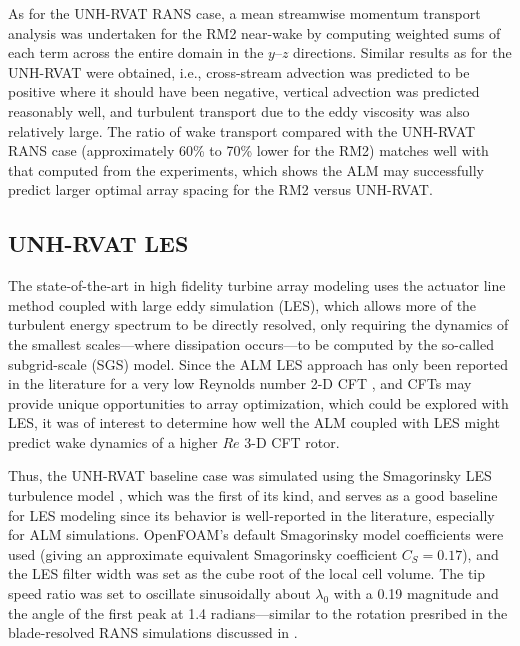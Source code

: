 \documentclass[times]{weauth}
\begin{document}
As for the UNH-RVAT RANS case, a mean streamwise momentum transport analysis was
undertaken for the RM2 near-wake by computing weighted sums of each term across
the entire domain in the $y$--$z$ directions. Similar results as for the
UNH-RVAT were obtained, i.e., cross-stream advection was predicted to be
positive where it should have been negative, vertical advection was predicted
reasonably well, and turbulent transport due to the eddy viscosity was also
relatively large. The ratio of wake transport compared with the UNH-RVAT RANS
case (approximately 60\% to 70\% lower for the RM2) matches well with that
computed from the experiments, which shows the ALM may successfully predict
larger optimal array spacing for the RM2 versus UNH-RVAT.


\subsection{UNH-RVAT LES}

The state-of-the-art in high fidelity turbine array modeling uses the actuator
line method coupled with large eddy simulation (LES), which allows more of the
turbulent energy spectrum to be directly resolved, only requiring the dynamics
of the smallest scales---where dissipation occurs---to be computed by the
so-called subgrid-scale (SGS) model. Since the ALM LES approach has only been
reported in the literature for a very low Reynolds number 2-D CFT
\cite{Shamsoddin2014}, and CFTs may provide unique opportunities to array
optimization, which could be explored with LES, it was of interest to determine
how well the ALM coupled with LES might predict wake dynamics of a higher $Re$
3-D CFT rotor.

Thus, the UNH-RVAT baseline case was simulated using the Smagorinsky LES
turbulence model \cite{Smagorinsky1963}, which was the first of its kind, and
serves as a good baseline for LES modeling since its behavior is well-reported
in the literature, especially for ALM simulations. OpenFOAM's default
Smagorinsky model coefficients were used (giving an approximate equivalent
Smagorinsky coefficient $C_S = 0.17$), and the LES filter width was set as the
cube root of the local cell volume. The tip speed ratio was set to oscillate
sinusoidally about $\lambda_0$ with a 0.19 magnitude and the angle of the first
peak at 1.4 radians---similar to the rotation presribed in the blade-resolved
RANS simulations discussed in \cite{Bachant2016-BR-CFD}.
\end{document}
